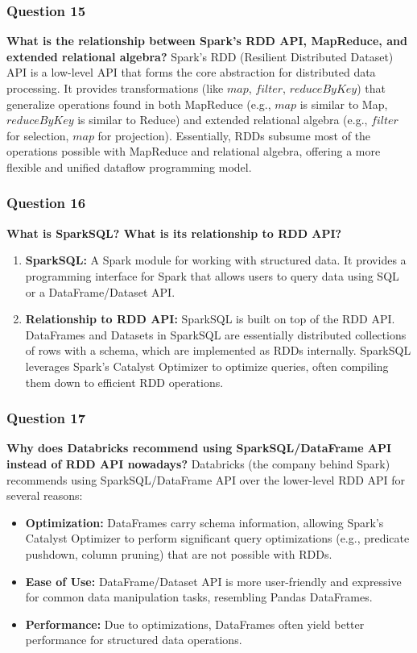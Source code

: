\documentclass{article}
\begin{document}
\subsubsection*{Question 15}
\textbf{What is the relationship between Spark's RDD API, MapReduce, and extended relational algebra?}
    Spark's RDD (Resilient Distributed Dataset) API is a low-level API that forms the core abstraction for distributed data processing. It provides transformations (like $map$, $filter$, $reduceByKey$) that generalize operations found in both MapReduce (e.g., $map$ is similar to Map, $reduceByKey$ is similar to Reduce) and extended relational algebra (e.g., $filter$ for selection, $map$ for projection). Essentially, RDDs subsume most of the operations possible with MapReduce and relational algebra, offering a more flexible and unified dataflow programming model.

\subsubsection*{Question 16}
\textbf{What is SparkSQL? What is its relationship to RDD API?}
    \begin{enumerate}[label=\alph*)]
        \item \textbf{SparkSQL:} A Spark module for working with structured data. It provides a programming interface for Spark that allows users to query data using SQL or a DataFrame/Dataset API.
        \item \textbf{Relationship to RDD API:} SparkSQL is built on top of the RDD API. DataFrames and Datasets in SparkSQL are essentially distributed collections of rows with a schema, which are implemented as RDDs internally. SparkSQL leverages Spark's Catalyst Optimizer to optimize queries, often compiling them down to efficient RDD operations.
    \end{enumerate}

\subsubsection*{Question 17}
\textbf{Why does Databricks recommend using SparkSQL/DataFrame API instead of RDD API nowadays?}
    Databricks (the company behind Spark) recommends using SparkSQL/DataFrame API over the lower-level RDD API for several reasons:
    \begin{itemize}
        \item \textbf{Optimization:} DataFrames carry schema information, allowing Spark's Catalyst Optimizer to perform significant query optimizations (e.g., predicate pushdown, column pruning) that are not possible with RDDs.
        \item \textbf{Ease of Use:} DataFrame/Dataset API is more user-friendly and expressive for common data manipulation tasks, resembling Pandas DataFrames.
        \item \textbf{Performance:} Due to optimizations, DataFrames often yield better performance for structured data operations.
    \end{itemize}
\end{document}
